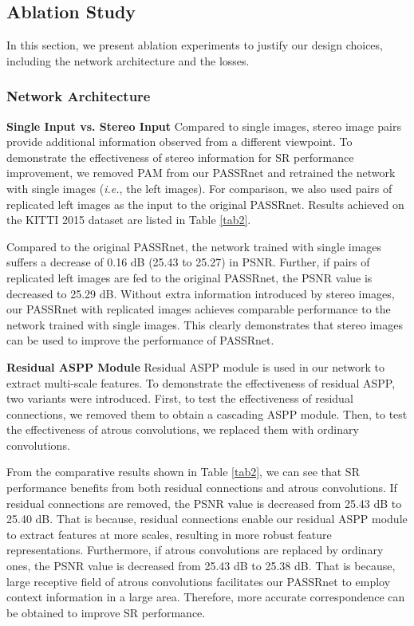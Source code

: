 \documentclass[10pt,twocolumn,letterpaper]{article}
\begin{document}
\subsection{Ablation Study}
In this section, we present ablation experiments to justify our design choices, including the network architecture and the losses.


\subsubsection{Network Architecture}
\label{sec4.3.1}
\noindent
\textbf{Single Input vs. Stereo Input}
Compared to single images, stereo image pairs provide additional information observed from a different viewpoint. To demonstrate the effectiveness of stereo information for SR performance improvement, we removed PAM from our PASSRnet and retrained the network with single images (\emph{i.e.}, the left images). For comparison, we also used pairs of replicated left images as the input to the original PASSRnet. Results achieved on the KITTI 2015 dataset are listed in Table \ref{tab2}. 

Compared to the original PASSRnet, the network trained with single images suffers a decrease of 0.16 dB (25.43 to 25.27) in PSNR. Further, if pairs of replicated left images are fed to the original PASSRnet, the PSNR value is decreased to 25.29 dB. Without extra information introduced by stereo images, our PASSRnet with replicated images achieves comparable performance to the network trained with single images. This clearly demonstrates that stereo images can be used to improve the performance of PASSRnet.

\noindent
\textbf{Residual ASPP Module}
Residual ASPP module is used in our network to extract multi-scale features. To demonstrate the effectiveness of residual ASPP, two variants were introduced. First, to test the effectiveness of residual connections, we removed them to obtain a cascading ASPP module. Then, to test the effectiveness of atrous convolutions, we replaced them with ordinary convolutions. 

From the comparative results shown in Table \ref{tab2}, we can see that SR performance benefits from both residual connections and atrous convolutions. If residual connections are removed, the PSNR value is decreased from 25.43 dB to 25.40 dB. That is because, residual connections enable our residual ASPP module to extract features at more scales, resulting in more robust feature representations. Furthermore, if atrous convolutions are replaced by ordinary ones, the PSNR value is decreased from 25.43 dB to 25.38 dB. That is because, large receptive field of atrous convolutions facilitates our PASSRnet to employ context information in a large area. Therefore, more accurate correspondence can be obtained to improve SR performance.
\end{document}

